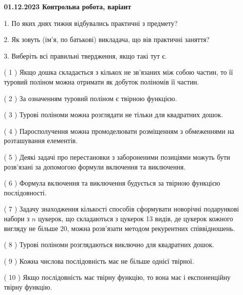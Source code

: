 \documentclass[12pt, ukrainian]{article}
\begin{document}
\vspace{4mm}
\newpage
\begin {large}

\textbf{01.12.2023 Контрольна робота, варіант  }\par


{
1. По яких днях тижня відбувались практичні з предмету?



\vspace{5mm}
2. Як зовуть (ім'я, по батькові) викладача, що вів практичні заняття?



\vspace{5mm}
3. Виберіть всі правильні твердження, якщо такі тут є.\par
\vspace{2mm}
( 1 ) Якщо дошка складається з кількох не зв’язаних між собою частин, то її туровий поліном можна отримати як добуток поліномів її частин.%

( 2 ) За означенням туровий поліном є твірною функцією.%

( 3 ) Турові поліноми можна розглядати не тільки для квадратних дошок.%

( 4 ) Паросполучення можна промоделювати розміщенням з обмеженнями на розташування елементів.%

( 5 ) Деякі задачі про перестановки з забороненими позиціями можуть бути розв’я\-за\-ні за допомогою формули включення та виключення.%

( 6 ) Формула включення та виключення будується за твірною функцією послідовності.%

( 7 ) Задачу знаходження кількості способів сформувати новорічні подарункові набори з $n$ цукерок, що складаються з цукерок 13 видів, де цукерок кожного вигляду не більше 20, можна розв’язати методом рекурентних співвідношень.%

( 8 ) Турові поліноми розглядаються виключно для квадратних дошок.%

( 9 ) Кожна числова послідовність має не більше однієї твірної.%

( 10 ) Якщо послідовність має твірну функцію, то вона має і експоненційну твірну функцію.%
}
\end {large}
\end{document}

